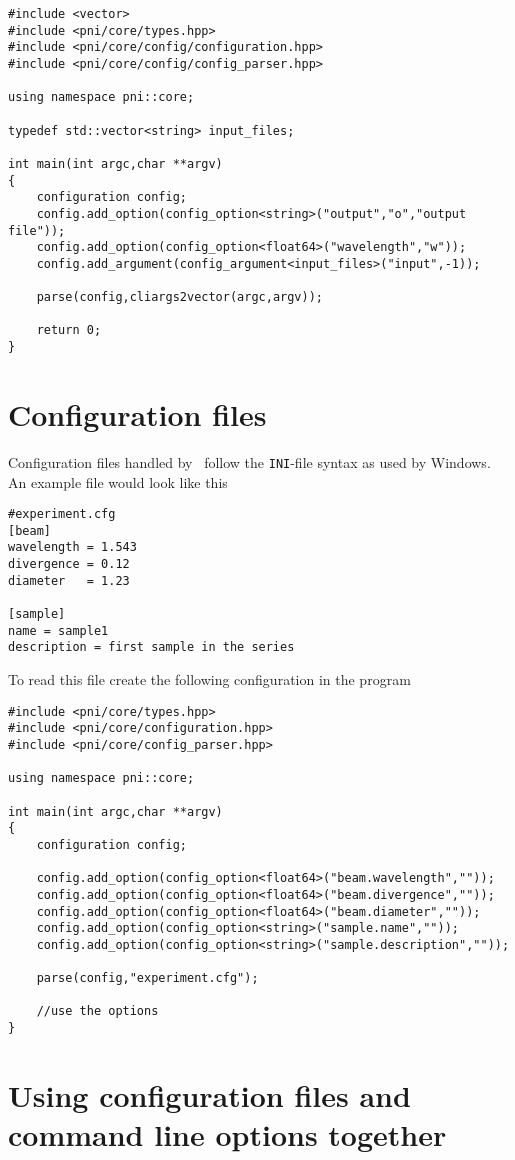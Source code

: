 \begin{verbatim}
#include <vector>
#include <pni/core/types.hpp>
#include <pni/core/config/configuration.hpp>
#include <pni/core/config/config_parser.hpp>

using namespace pni::core;

typedef std::vector<string> input_files;

int main(int argc,char **argv)
{
    configuration config;
    config.add_option(config_option<string>("output","o","output file"));
    config.add_option(config_option<float64>("wavelength","w"));
    config.add_argument(config_argument<input_files>("input",-1));

    parse(config,cliargs2vector(argc,argv));

    return 0;
}
\end{verbatim}

\section{Configuration files}

Configuration files handled by \libpnicore\ follow the \texttt{INI}-file syntax as
used by Windows. 
An example file would look like this
\begin{verbatim}
#experiment.cfg
[beam]
wavelength = 1.543
divergence = 0.12
diameter   = 1.23

[sample]
name = sample1
description = first sample in the series
\end{verbatim}
To read this file create the following configuration in the program
\begin{verbatim}
#include <pni/core/types.hpp>
#include <pni/core/configuration.hpp>
#include <pni/core/config_parser.hpp>

using namespace pni::core;

int main(int argc,char **argv)
{
    configuration config;

    config.add_option(config_option<float64>("beam.wavelength",""));
    config.add_option(config_option<float64>("beam.divergence",""));
    config.add_option(config_option<float64>("beam.diameter",""));
    config.add_option(config_option<string>("sample.name",""));
    config.add_option(config_option<string>("sample.description",""));

    parse(config,"experiment.cfg");

    //use the options
}
\end{verbatim}


\section{Using configuration files and command line options together}

